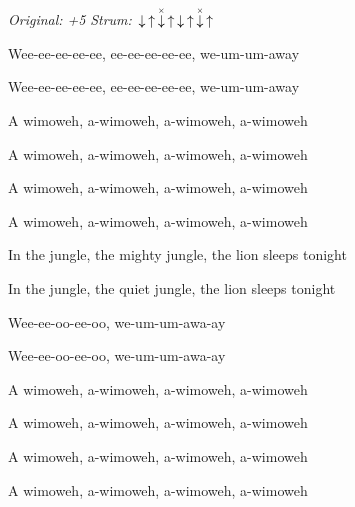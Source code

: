 \begin{song}


\begin{headerbox}
\RaiseBoxWithChucks
\textit{Original: +5} \quad
\textit{Strum:} $\Down\Up\ChuckDown\Up\Down\Up\ChuckDown\Up$
\end{headerbox}

\begin{hchordbox}
\end{hchordbox}

\Large

\Intro {} \par
Wee-ee-ee-ee-ee, ee-ee-ee-ee-ee, we-um-um-away \par
Wee-ee-ee-ee-ee, ee-ee-ee-ee-ee, we-um-um-away \par

\bigskip

A wimoweh, a-wimoweh, a-wimoweh, a-wimoweh \par
A wimoweh, a-wimoweh, a-wimoweh, a-wimoweh \par
A wimoweh, a-wimoweh, a-wimoweh, a-wimoweh \par
A wimoweh, a-wimoweh, a-wimoweh, a-wimoweh \par

\bigskip

In the jungle, the mighty jungle, the lion sleeps tonight \par
{}In the jungle, the quiet jungle, the lion sleeps tonight \par

\bigskip

\begin{chorusboxwide}{\Chorus}
 \par

\bigskip

 \par
{}Wee-ee-oo-ee-oo, we-um-um-awa-ay \par
{}Wee-ee-oo-ee-oo, we-um-um-awa-ay \par

\bigskip

 \par
A wimoweh, a-wimoweh, a-wimoweh, a-wimoweh \par
A wimoweh, a-wimoweh, a-wimoweh, a-wimoweh \par
A wimoweh, a-wimoweh, a-wimoweh, a-wimoweh \par
A wimoweh, a-wimoweh, a-wimoweh, a-wimoweh \par
\end{chorusboxwide}


\end{song}
